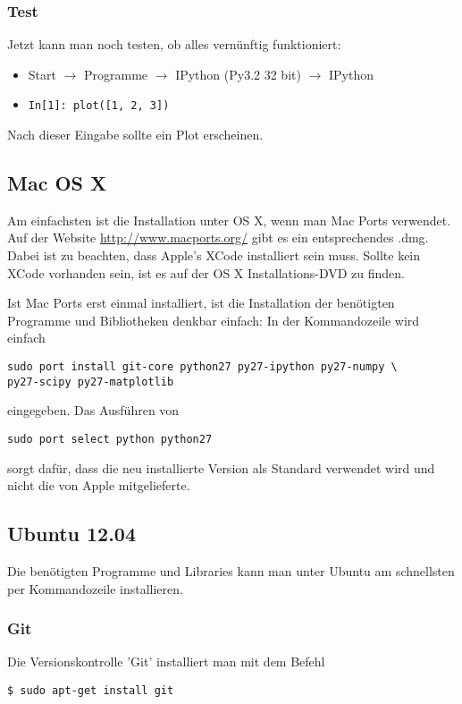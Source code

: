 \subsubsection{Test}
Jetzt kann man noch testen, ob alles vernünftig funktioniert:
\begin{itemize}
  \item Start $\rightarrow$ Programme $\rightarrow$ IPython (Py3.2 32 bit) $\rightarrow$ IPython
  \item \texttt{In[1]: plot([1, 2, 3])}
\end{itemize}
Nach dieser Eingabe sollte ein Plot erscheinen.

\subsection{Mac OS X}
Am einfachsten ist die Installation unter OS X, wenn man Mac Ports verwendet.
Auf der Website \url{http://www.macports.org/} gibt es ein entsprechendes .dmg.
Dabei ist zu beachten, dass Apple's XCode installiert sein muss.
Sollte kein XCode vorhanden sein, ist es auf der OS X Installations-DVD zu finden.

Ist Mac Ports erst einmal installiert, ist die Installation der benötigten Programme und Bibliotheken denkbar einfach: In der Kommandozeile wird einfach
\begin{verbatim}
sudo port install git-core python27 py27-ipython py27-numpy \
py27-scipy py27-matplotlib
\end{verbatim}
eingegeben.
Das Ausführen von
\begin{verbatim}
sudo port select python python27
\end{verbatim}
sorgt dafür, dass die neu installierte Version als Standard verwendet wird und nicht die von Apple mitgelieferte.

\subsection{Ubuntu 12.04}
Die benötigten Programme und Libraries kann man unter Ubuntu am schnellsten per Kommandozeile installieren.

\subsubsection{Git}
Die Versionskontrolle 'Git' installiert man mit dem Befehl
\begin{verbatim}
$ sudo apt-get install git
\end{verbatim}

